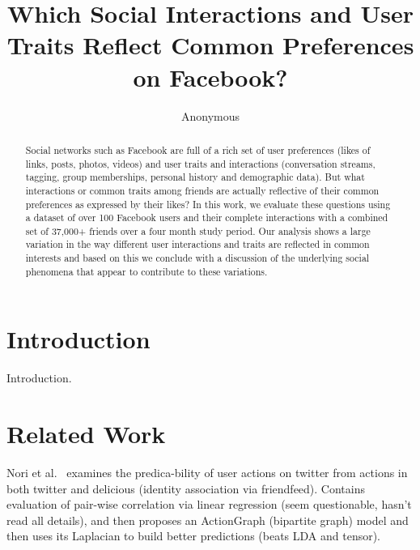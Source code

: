 \documentclass[letterpaper]{article}
\begin{document}
%
\title{Which Social Interactions and User Traits Reflect Common Preferences on Facebook?}
\author{Anonymous}
\maketitle
\begin{abstract}
Social networks such as Facebook are full of a rich set of user preferences (likes of links, posts, photos, videos) and user traits and interactions (conversation streams, tagging, group memberships, personal history and demographic data). But what interactions or common traits among friends are actually reflective of their common preferences as expressed by their likes? In this work, we evaluate these questions using a dataset of over 100 Facebook users and their complete interactions with a combined set of 37,000+ friends over a four month study period. Our analysis shows a large variation in the way different user interactions and traits are reflected in common interests and based on this we conclude with a discussion of the underlying social phenomena that appear to contribute to these variations.
\end{abstract}


\section{Introduction}


Introduction. \cite{influence}


\section{Related Work}


Nori et al.~\cite{nori2011exploiting} examines the predica-bility of user actions on twitter from actions in both twitter and delicious (identity association via friendfeed). Contains evaluation of pair-wise correlation via linear regression (seem questionable, hasn't read all details), and then proposes an ActionGraph (bipartite graph) model and then uses its Laplacian to build better predictions (beats LDA and tensor). 
\end{document}
